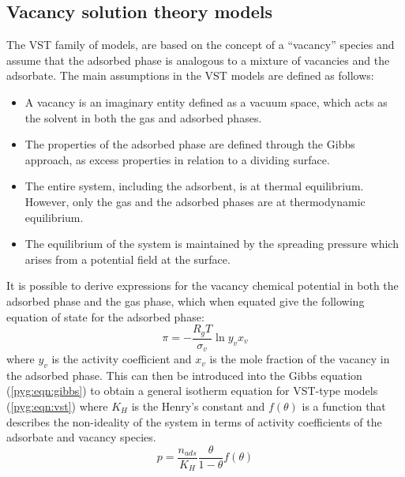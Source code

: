 \subsection{Vacancy solution theory models}\label{pyg:models:vst}

The \gls{VST} family of models,
are based on the concept of a “vacancy” species and
assume that the adsorbed phase is analogous to a mixture of
vacancies and the adsorbate. The main assumptions in the
\gls{VST} models are defined as follows:

\begin{itemize}

	\item A vacancy is an imaginary entity defined as a vacuum
	      space, which acts as the solvent in both the gas and adsorbed
	      phases.
	\item The properties of the adsorbed phase are defined through
	      the Gibbs approach, as excess properties in relation to
	      a dividing surface.
	\item The entire system, including the adsorbent, is at
	      thermal equilibrium. However, only the gas and the adsorbed
	      phases are at thermodynamic equilibrium.
	\item The equilibrium of the system is maintained by the
	      spreading pressure which arises from a potential field
	      at the surface.

\end{itemize}

It is possible to derive expressions for the vacancy chemical
potential in both the adsorbed phase and the gas phase, which when
equated give the following equation of state for the adsorbed phase:
%
\begin{equation}
	\pi = - \frac{R_g T}{\sigma_v} \ln{y_v x_v}
\end{equation}
%
where \(y_v\) is the activity coefficient and \(x_v\) is the mole
fraction of the vacancy in the adsorbed phase.
This can then be introduced into the Gibbs equation (\autoref{pyg:eqn:gibbs})
to obtain a general isotherm equation for \gls{VST}-type models
(\autoref{pyg:eqn:vst}) where \(K_H\) is the Henry’s constant and
\(f(\theta)\) is a function that describes the non-ideality of the
system in terms of activity coefficients of the adsorbate and
vacancy species.
%
\begin{equation}\label{pyg:eqn:vst}
	p = \frac{n_{ads}}{K_H} \frac{\theta}{1-\theta} f(\theta)
\end{equation}

